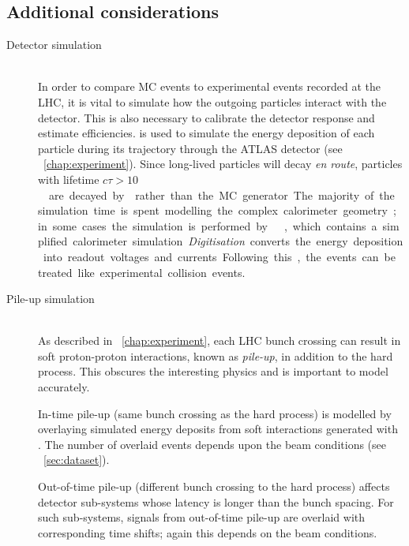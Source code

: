 \subsection{Additional considerations}
\label{sec:mc:other}

\begin{description}
\item[Detector simulation] \hfill \\
	In order to compare MC events to experimental events recorded at the LHC, 
	it is vital to simulate how the outgoing particles interact with the detector. This 
	is also necessary to calibrate the detector response and estimate efficiencies. 
	\geant \cite{GEANT4,ATLAS-simulation} is used to simulate the energy deposition of 
	each particle during its trajectory through the ATLAS detector (see 
	\Chapter~\ref{chap:experiment}). Since long-lived particles will decay \textit{en 
	route}, particles with lifetime \unit{$c\tau > 10$}{\milli\metre} are decayed by 
	\geant rather than the MC generator. The majority of the simulation time is 
	spent modelling the complex calorimeter geometry; in some cases the simulation is 
	performed by \atlfast \cite{Atlfast}, which contains a simplified calorimeter 
	simulation.

	\textit{Digitisation} converts the energy deposition into readout voltages and 
	currents. Following this, the events can be treated like experimental collision 
	events.
\item[Pile-up simulation] \hfill \\
	As described in \Chapter~\ref{chap:experiment}, each LHC bunch crossing can 
	result in soft proton-proton interactions, known as \textit{pile-up}, in addition to 
	the hard process. This obscures the interesting physics and is important to model 
	accurately.

	In-time pile-up (same bunch crossing as the hard process) is modelled by overlaying 
	simulated energy deposits from soft \pp interactions generated with . The 
	number of overlaid events depends upon the beam conditions (see 
	\Section~\ref{sec:dataset}).

	Out-of-time pile-up (different bunch crossing to the hard process) affects detector 
	sub-systems whose latency is longer than the bunch spacing. For such sub-systems, 
	signals from out-of-time pile-up are overlaid with corresponding time shifts; again 
	this depends on the beam conditions.
\end{description}



